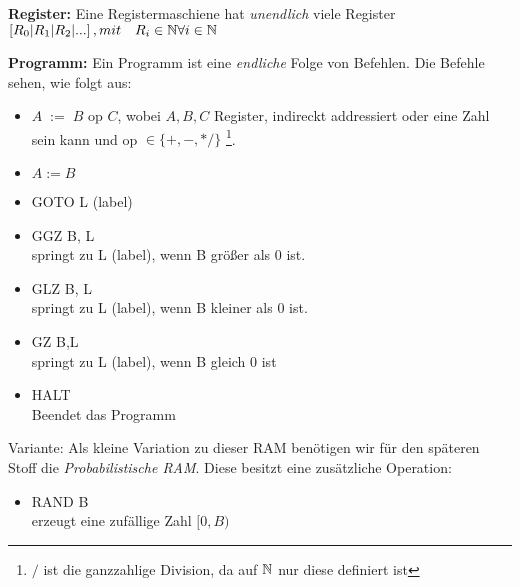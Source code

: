 \begin{description}

\item{\bfseries Register:} Eine Registermaschiene hat \emph{unendlich} viele Register $\left[ R_0 | R_1 | R_2 | ... \right], mit \quad R_i \in \mathbb{N} \forall i \in \mathbb{N}$

\item{\bfseries Programm:} Ein Programm ist eine \emph{endliche} Folge von Befehlen. Die Befehle sehen, wie folgt aus:

\begin{itemize}

\item $A \; := \; B \text{ op } C$, wobei $A,B,C$ Register, indireckt addressiert oder eine Zahl sein kann und op $\in \{  +, -, * / \}$ \footnote{$/$ ist die ganzzahlige Division, da auf $\mathbb{N}$ nur diese definiert ist}.

\item $A := B$

\item GOTO L (label)

\item GGZ B, L\\
springt zu L (label), wenn B größer als 0 ist.

\item GLZ B, L\\
springt zu L (label), wenn B kleiner als 0 ist.

\item GZ B,L\\
springt zu L (label), wenn B gleich 0 ist

\item HALT\\
Beendet das Programm

\end{itemize}

\item{Variante:} Als kleine Variation zu dieser RAM benötigen wir für den späteren Stoff die \emph{Probabilistische RAM}. Diese besitzt eine zusätzliche Operation:

\begin{itemize}

\item RAND B\\
erzeugt eine zufällige Zahl $[0,B)$

\end{itemize}

\end{description}

